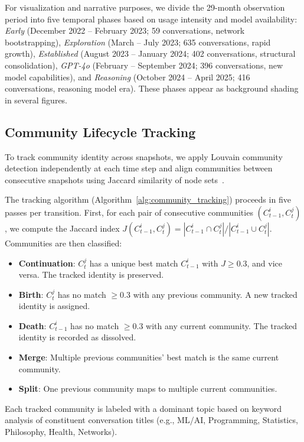 \documentclass[10pt,letterpaper]{article}
\begin{document}
For visualization and narrative purposes, we divide the 29-month observation period into five temporal phases based on usage intensity and model availability: \emph{Early} (December 2022 -- February 2023; 59 conversations, network bootstrapping), \emph{Exploration} (March -- July 2023; 635 conversations, rapid growth), \emph{Established} (August 2023 -- January 2024; 402 conversations, structural consolidation), \emph{GPT-4o} (February -- September 2024; 396 conversations, new model capabilities), and \emph{Reasoning} (October 2024 -- April 2025; 416 conversations, reasoning model era). These phases appear as background shading in several figures.

\subsection{Community Lifecycle Tracking}
\label{sec:community_tracking}

To track community identity across snapshots, we apply Louvain community detection independently at each time step and align communities between consecutive snapshots using Jaccard similarity of node sets~\citep{jaccard1912distribution,greene2010tracking}.

The tracking algorithm (Algorithm~\ref{alg:community_tracking}) proceeds in five passes per transition. First, for each pair of consecutive communities $(C_{t-1}^i, C_t^j)$, we compute the Jaccard index $J(C_{t-1}^i, C_t^j) = |C_{t-1}^i \cap C_t^j| / |C_{t-1}^i \cup C_t^j|$. Communities are then classified:

\begin{itemize}
  \item \textbf{Continuation}: $C_t^j$ has a unique best match $C_{t-1}^i$ with $J \geq 0.3$, and vice versa. The tracked identity is preserved.
  \item \textbf{Birth}: $C_t^j$ has no match $\geq 0.3$ with any previous community. A new tracked identity is assigned.
  \item \textbf{Death}: $C_{t-1}^i$ has no match $\geq 0.3$ with any current community. The tracked identity is recorded as dissolved.
  \item \textbf{Merge}: Multiple previous communities' best match is the same current community.
  \item \textbf{Split}: One previous community maps to multiple current communities.
\end{itemize}

Each tracked community is labeled with a dominant topic based on keyword analysis of constituent conversation titles (e.g., ML/AI, Programming, Statistics, Philosophy, Health, Networks).
\end{document}
